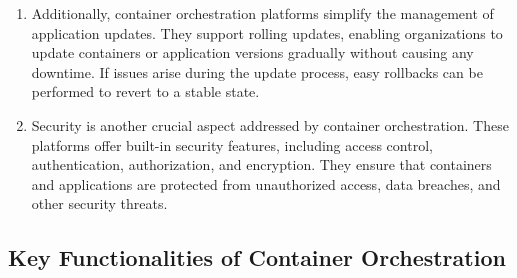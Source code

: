 \begin{enumerate}
    \item Additionally, container orchestration platforms simplify the management of application updates. They support rolling updates, enabling organizations to update containers or application versions gradually without causing any downtime. If issues arise during the update process, easy rollbacks can be performed to revert to a stable state.

    \item Security is another crucial aspect addressed by container orchestration. These platforms offer built-in security features, including access control, authentication, authorization, and encryption. They ensure that containers and applications are protected from unauthorized access, data breaches, and other security threats.
\end{enumerate}

\subsection*{Key Functionalities of Container Orchestration}

